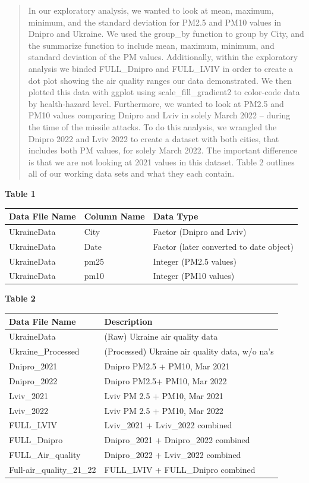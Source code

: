 \documentclass[
  12pt,
]{article}
\begin{document}
\begin{quote}
In our exploratory analysis, we wanted to look at mean, maximum,
minimum, and the standard deviation for PM2.5 and PM10 values in Dnipro
and Ukraine. We used the group\_by function to group by City, and the
summarize function to include mean, maximum, minimum, and standard
deviation of the PM values. Additionally, within the exploratory
analysis we binded FULL\_Dnipro and FULL\_LVIV in order to create a dot
plot showing the air quality ranges our data demonstrated. We then
plotted this data with ggplot using scale\_fill\_gradient2 to color-code
data by health-hazard level. Furthermore, we wanted to look at PM2.5 and
PM10 values comparing Dnipro and Lviv in solely March 2022 -- during the
time of the missile attacks. To do this analysis, we wrangled the Dnipro
2022 and Lviv 2022 to create a dataset with both cities, that includes
both PM values, for solely March 2022. The important difference is that
we are not looking at 2021 values in this dataset. Table 2 outlines all
of our working data sets and what they each contain.
\end{quote}

\newpage

\textbf{Table 1}

\begin{longtable}[]{@{}lll@{}}
\toprule
Data File Name & Column Name & Data Type \\
\midrule
\endhead
UkraineData & City & Factor (Dnipro and Lviv) \\
UkraineData & Date & Factor (later converted to date object) \\
UkraineData & pm25 & Integer (PM2.5 values) \\
UkraineData & pm10 & Integer (PM10 values) \\
\bottomrule
\end{longtable}

\textbf{Table 2}

\begin{longtable}[]{@{}ll@{}}
\toprule
Data File Name & Description \\
\midrule
\endhead
UkraineData & (Raw) Ukraine air quality data \\
Ukraine\_Processed & (Processed) Ukraine air quality data, w/o na's \\
Dnipro\_2021 & Dnipro PM2.5 + PM10, Mar 2021 \\
Dnipro\_2022 & Dnipro PM2.5+ PM10, Mar 2022 \\
Lviv\_2021 & Lviv PM 2.5 + PM10, Mar 2021 \\
Lviv\_2022 & Lviv PM 2.5 + PM10, Mar 2022 \\
FULL\_LVIV & Lviv\_2021 + Lviv\_2022 combined \\
FULL\_Dnipro & Dnipro\_2021 + Dnipro\_2022 combined \\
FULL\_Air\_quality & Dnipro\_2022 + Lviv\_2022 combined \\
Full-air\_quality\_21\_22 & FULL\_LVIV + FULL\_Dnipro combined \\
\bottomrule
\end{longtable}
\end{document}
